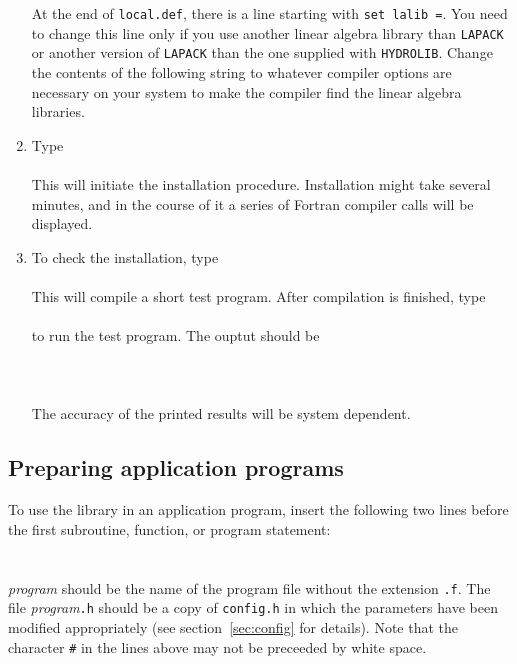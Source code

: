 \documentclass[12pt]{article}
\newcommand{\prog}[1]{{\tt #1}}
\newcommand{\wsp}{\hspace*{0.5cm}}
\begin{document}
\begin{enumerate}
At the end of \prog{local.def}, there is a line starting with
\prog{set lalib =}. You need to change this line only if you
use another linear algebra library than \prog{LAPACK} or another
version of \prog{LAPACK} than the one supplied with \prog{HYDROLIB}.
Change the contents of the following string to
whatever compiler options are necessary on your system to make the
compiler find the linear algebra libraries.

\item
Type\\
\wsp\prog{install\_lib}\\
This will initiate the installation procedure. Installation might take several
minutes, and in the course of it a series of Fortran compiler calls will
be displayed.

\item
To check the installation, type\\
\wsp\prog{fc example.f}\\
This will compile a short test program. After
compilation is finished, type\\
\wsp\prog{a.out}\\
to run the test program. The ouptut should be\\
\wsp\prog{N = 6}\\
\wsp\prog{3.288792419691321   4.296910545080898}\\
\wsp\prog{9.912899454371797   94.71505251108327}\\
The accuracy of the printed results will be system dependent.

\end{enumerate}

\subsection{Preparing application programs}

To use the library in an application program, insert the following two lines
before the first subroutine, function, or program statement:\\
\wsp\prog{\#include "}{\em program}\prog{.h"}\\\
\wsp\prog{\#include <subr.f>}\\
{\em program} should be the name of the program file without the
extension \prog{.f}. The file {\em program}\prog{.h} should be a
copy of \prog{config.h} in which the parameters have been modified
appropriately (see section~\ref{sec:config} for details).
Note that the character \prog{\#} in the lines above may not be
preceeded by white space.
\end{document}
